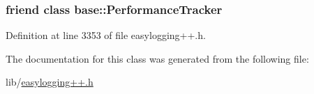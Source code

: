 \subsubsection[{base\+::\+Performance\+Tracker}]{\setlength{\rightskip}{0pt plus 5cm}friend class {\bf base\+::\+Performance\+Tracker}\hspace{0.3cm}{\ttfamily [friend]}}\label{classel_1_1_performance_tracking_callback_a05f271f9cc2531409fe682c6ce0d9feb}


Definition at line 3353 of file easylogging++.\+h.



The documentation for this class was generated from the following file\+:\begin{DoxyCompactItemize}
\item 
lib/\hyperlink{easylogging_09_09_8h}{easylogging++.\+h}\end{DoxyCompactItemize}
